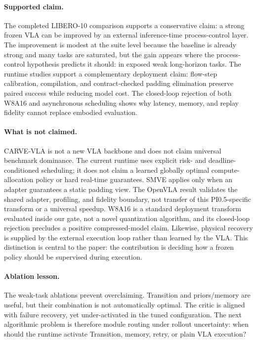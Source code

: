 \documentclass[runningheads]{waica}
\newcommand{\method}{CARVE-VLA}
\begin{document}
\paragraph{Supported claim.}
The completed LIBERO-10 comparison supports a conservative claim: a strong frozen VLA can be improved by an external inference-time process-control layer.
The improvement is modest at the suite level because the baseline is already strong and many tasks are saturated, but the gain appears where the process-control hypothesis predicts it should: in exposed weak long-horizon tasks.
The runtime studies support a complementary deployment claim: flow-step
calibration, compilation, and contract-checked padding elimination preserve
paired success while reducing model cost.
The closed-loop rejection of both W8A16 and asynchronous scheduling shows why
latency, memory, and replay fidelity cannot replace embodied evaluation.

\paragraph{What is not claimed.}
\method{} is not a new VLA backbone and does not claim universal benchmark dominance.
The current runtime uses explicit risk- and deadline-conditioned scheduling; it
does not claim a learned globally optimal compute-allocation policy or hard
real-time guarantees. SMVE applies only when an adapter guarantees a static
padding view. The OpenVLA result validates the shared adapter, profiling, and
fidelity boundary, not transfer of this PI0.5-specific transform or a universal
speedup.
W8A16 is a standard deployment transform evaluated inside
our gate, not a novel quantization algorithm, and its closed-loop rejection
precludes a positive compressed-model claim. Likewise, physical recovery is
supplied by the external execution loop rather than learned by the VLA.
This distinction is central to the paper: the contribution is deciding how a frozen policy should be supervised during execution.

\paragraph{Ablation lesson.}
The weak-task ablations prevent overclaiming.
Transition and priors/memory are useful, but their combination is not automatically optimal.
The critic is aligned with failure recovery, yet under-activated in the tuned configuration.
The next algorithmic problem is therefore module routing under rollout uncertainty: when should the runtime activate Transition, memory, retry, or plain VLA execution?
\end{document}
